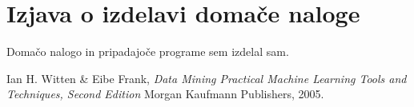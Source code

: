\documentclass[a4paper,11pt]{article}
\begin{document}
%


\section{Izjava o izdelavi domače naloge}
Domačo nalogo in pripadajoče programe sem izdelal sam.


\begin{thebibliography}{9}

   Ian H. Witten \& Eibe Frank,
   \emph{Data Mining Practical Machine Learning Tools and Techniques, Second Edition}
   Morgan Kaufmann Publishers,  
   2005.

\end{thebibliography}
\end{document}
